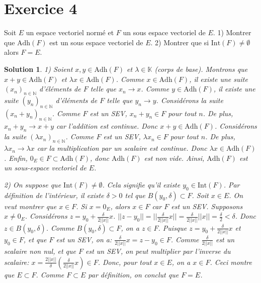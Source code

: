\documentclass{article}
\newtheorem{solution}{Solution}
\begin{document}
\section*{Exercice 4}
Soit $E$ un espace vectoriel normé et $F$ un sous espace vectoriel de $E$.
1) Montrer que $\text{Adh}(F)$ est un sous espace vectoriel de $E$.
2) Montrer que si $\text{Int}(F) \neq \emptyset$ alors $F = E$.

\begin{solution}
1) Soient $x, y \in \text{Adh}(F)$ et $\lambda \in \mathbb{K}$ (corps de base). Montrons que $x+y \in \text{Adh}(F)$ et $\lambda x \in \text{Adh}(F)$.
Comme $x \in \text{Adh}(F)$, il existe une suite $(x_n)_{n \in \mathbb{N}}$ d'éléments de $F$ telle que $x_n \to x$.
Comme $y \in \text{Adh}(F)$, il existe une suite $(y_n)_{n \in \mathbb{N}}$ d'éléments de $F$ telle que $y_n \to y$.
Considérons la suite $(x_n + y_n)_{n \in \mathbb{N}}$. Comme $F$ est un SEV, $x_n + y_n \in F$ pour tout $n$.
De plus, $x_n + y_n \to x + y$ car l'addition est continue.
Donc $x+y \in \text{Adh}(F)$.
Considérons la suite $(\lambda x_n)_{n \in \mathbb{N}}$. Comme $F$ est un SEV, $\lambda x_n \in F$ pour tout $n$.
De plus, $\lambda x_n \to \lambda x$ car la multiplication par un scalaire est continue.
Donc $\lambda x \in \text{Adh}(F)$.
Enfin, $0_E \in F \subset \text{Adh}(F)$, donc $\text{Adh}(F)$ est non vide.
Ainsi, $\text{Adh}(F)$ est un sous-espace vectoriel de $E$.

2) On suppose que $\text{Int}(F) \neq \emptyset$.
Cela signifie qu'il existe $y_0 \in \text{Int}(F)$.
Par définition de l'intérieur, il existe $\delta > 0$ tel que $B(y_0, \delta) \subset F$.
Soit $x \in E$. On veut montrer que $x \in F$.
Si $x = 0_E$, alors $x \in F$ car $F$ est un SEV.
Supposons $x \ne 0_E$.
Considérons $z = y_0 + \frac{\delta}{2 ||x||} x$.
$||z - y_0|| = || \frac{\delta}{2 ||x||} x || = \frac{\delta}{2 ||x||} ||x|| = \frac{\delta}{2} < \delta$.
Donc $z \in B(y_0, \delta)$. Comme $B(y_0, \delta) \subset F$, on a $z \in F$.
Puisque $z = y_0 + \frac{\delta}{2 ||x||} x$ et $y_0 \in F$, et que $F$ est un SEV, on a:
$\frac{\delta}{2 ||x||} x = z - y_0 \in F$.
Comme $\frac{\delta}{2 ||x||}$ est un scalaire non nul, et que $F$ est un SEV, on peut multiplier par l'inverse du scalaire:
$x = \frac{2 ||x||}{\delta} (\frac{\delta}{2 ||x||} x) \in F$.
Donc, pour tout $x \in E$, on a $x \in F$.
Ceci montre que $E \subset F$. Comme $F \subset E$ par définition, on conclut que $F=E$.
\end{solution}
\end{document}
